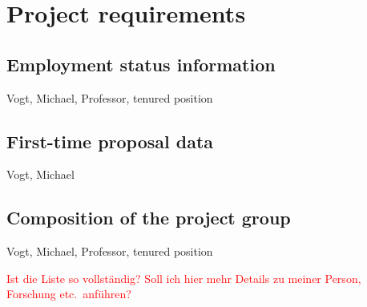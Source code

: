 \documentclass[a4paper,12pt]{article}
\begin{document}






\section{Project requirements}

\subsection{Employment status information}

Vogt, Michael, Professor, tenured position

\subsection{First-time proposal data}

Vogt, Michael

\subsection{Composition of the project group}
Vogt, Michael, Professor, tenured position

\noindent \textcolor{red}{Ist die Liste so vollst\"andig? Soll ich hier mehr Details zu meiner Person, Forschung etc.\ anf\"uhren?}
\end{document}

